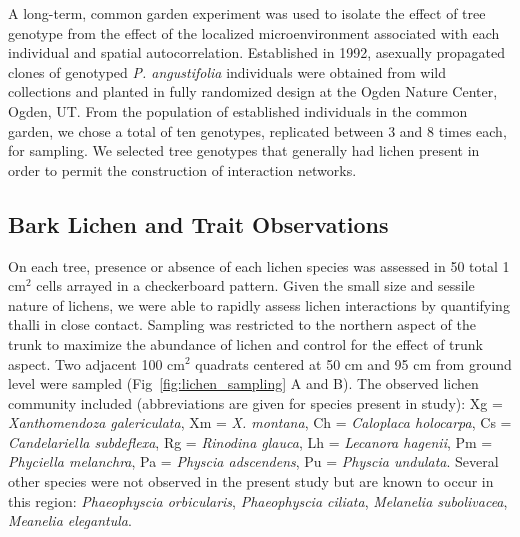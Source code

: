 \documentclass[fleqn,12pt]{olplainarticle}
\begin{document}
A long-term, common garden experiment was used to isolate the effect
of tree genotype from the effect of the localized microenvironment
associated with each individual and spatial
autocorrelation. Established in 1992, asexually propagated clones of
genotyped \textit{P. angustifolia} individuals were obtained from wild
collections and planted in fully randomized design at the Ogden Nature
Center, Ogden, UT. From the population of established individuals in
the common garden, we chose a total of ten genotypes, replicated
between 3 and 8 times each, for sampling. We selected tree genotypes
that generally had lichen present in order to permit the construction
of interaction networks.



\subsection*{Bark Lichen and Trait Observations}


On each tree, presence or absence of each lichen species was assessed
in 50 total 1 cm$^2$ cells arrayed in a checkerboard pattern. Given
the small size and sessile nature of lichens, we were able to rapidly
assess lichen interactions by quantifying thalli in close
contact. Sampling was restricted to the northern aspect of the trunk
to maximize the abundance of lichen and control for the effect of
trunk aspect. Two adjacent 100 cm$^2$ quadrats centered at 50 cm and
95 cm from ground level were sampled (Fig~\ref{fig:lichen_sampling} A
and B). The observed lichen community included (abbreviations are
given for species present in study): Xg = \textit{Xanthomendoza
  galericulata}, Xm = \textit{X. montana}, Ch = \textit{Caloplaca
  holocarpa}, Cs = \textit{Candelariella subdeflexa}, Rg =
\textit{Rinodina glauca}, Lh = \textit{Lecanora hagenii}, Pm =
\textit{Phyciella melanchra}, Pa = \textit{Physcia adscendens}, Pu =
\textit{Physcia undulata}. Several other species were not observed in
the present study but are known to occur in this region:
\textit{Phaeophyscia orbicularis}, \textit{Phaeophyscia ciliata},
\textit{Melanelia subolivacea}, \textit{Meanelia elegantula}.
\end{document}
